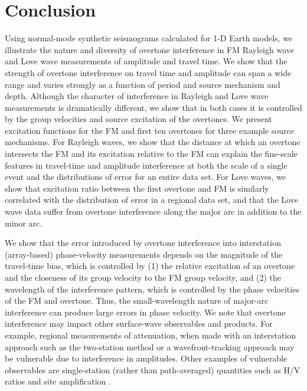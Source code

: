 \documentclass[extra,mreferee]{gji}
\begin{document}
\section{Conclusion}
Using normal-mode synthetic seismograms calculated for 1-D Earth models, we illustrate the nature and diversity of overtone interference in FM Rayleigh wave and Love wave measurements of amplitude and travel time. We show that the strength of overtone interference on travel time and amplitude can span a wide range and varies strongly as a function of period and source mechanism and depth. Although the character of interference in Rayleigh and Love wave measurements is dramatically different, we show that in both cases it is controlled by the group velocities and source excitation of the overtones. We present excitation functions for the FM and first ten overtones for three example source mechanisms. For Rayleigh waves, we show that the distance at which an overtone intersects the FM and its excitation relative to the FM can explain the fine-scale features in travel-time and amplitude interference at both the scale of a single event and the distributions of error for an entire data set. For Love waves, we show that excitation ratio between the first overtone and FM is similarly correlated with the distribution of error in a regional data set, and that the Love wave data suffer from overtone interference along the major arc in addition to the minor arc.

We show that the error introduced by overtone interference into interstation (array-based) phase-velocity measurements depends on the magnitude of the travel-time bias, which is controlled by (1) the relative excitation of an overtone and the closeness of its group velocity to the FM group velocity, and (2) the wavelength of the interference pattern, which is controlled by the phase velocities of the FM and overtone. Thus, the small-wavelength nature of major-arc interference can produce large errors in phase velocity. We note that overtone interference may impact other surface-wave observables and products. For example, regional measurements of attenuation, when made with an interstation approach such as the two-station method \citep{zhou2020rayleigh} or a wavefront-tracking approach \citep{xbaoattenuationsurfacewaves} may be vulnerable due to interference in amplitudes. Other examples of vulnerable observables are single-station (rather than path-averaged) quantities such as H/V ratios \citep{tanimoto2008zh} and site amplification \citep{eddy2014local,schardong2019anatomy}. 
\end{document}
